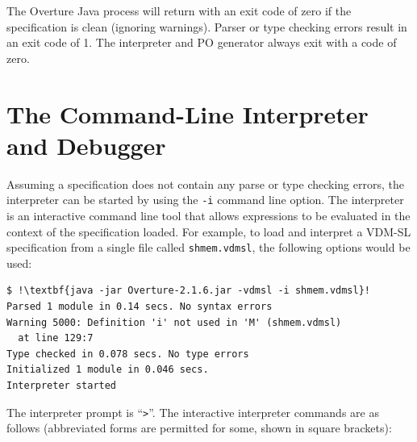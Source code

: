 \documentclass{overturerepchap}
\begin{document}
The Overture Java process will return with an exit code of zero if the
specification is clean (ignoring warnings). Parser or type checking
errors result in an exit code of 1. The interpreter and PO generator
always exit with a code of zero.

\section{The Command-Line Interpreter and Debugger}\label{sec:commandlineinterpreter}

Assuming a specification does not contain any parse or type checking errors, the interpreter can be
started by using the \texttt{-i} command line option.
The interpreter is an interactive command line tool that allows expressions to be evaluated in the
context of the specification loaded. For example, to load and interpret a
VDM-SL specification from a single file called \texttt{shmem.vdmsl},
the following options would be used:

\begin{lstlisting}
$ !\textbf{java -jar Overture-2.1.6.jar -vdmsl -i shmem.vdmsl}!
Parsed 1 module in 0.14 secs. No syntax errors
Warning 5000: Definition 'i' not used in 'M' (shmem.vdmsl) 
  at line 129:7
Type checked in 0.078 secs. No type errors
Initialized 1 module in 0.046 secs.
Interpreter started
\end{lstlisting}

The interpreter prompt is ``\texttt{>}''. The
interactive interpreter commands are as follows (abbreviated forms are
permitted for some, shown in square brackets):
\end{document}
